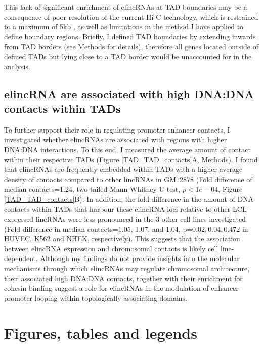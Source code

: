 \documentclass[11pt,a4paper]{report}
\begin{document}
This lack of significant enrichment of elincRNAs at TAD boundaries may be a consequence of poor resolution of the current Hi-C technology, which is restrained to a maximum of 5kb \cite{Rao2014}⁠, as well as limitations in the method I have applied to define boundary regions. Briefly, I defined TAD boundaries by extending inwards from TAD borders (see Methods for details), therefore all genes located outside of defined TADs but lying close to a TAD border would be unaccounted for in the analysis. 


\subsection*{elincRNA are associated with high DNA:DNA contacts within TADs}

To further support their role in regulating promoter-enhancer contacts, I investigated whether elincRNAs are associated with regions with higher DNA:DNA interactions. To this end, I measured the average amount of contact within their respective TADs (Figure \ref{TAD_TAD_contacts}A, Methods). I found that elincRNAs are frequently embedded within TADs with a higher average density of contacts compared to other lincRNAs in GM12878 (Fold difference of median contacts=1.24, two-tailed Mann-Whitney U test, $p<1e-04$, Figure \ref{TAD_TAD_contacts}B). In addition, the fold difference in the amount of DNA contacts within TADs that harbour these elincRNA loci relative to other LCL-expressed lincRNAs were less pronounced in the 3 other cell lines investigated (Fold difference in median contacts=1.05, 1.07, and 1.04, p=$0.02, 0.04, 0.472$ in HUVEC, K562 and NHEK, respectively). This suggests that the association between elincRNA expression and chromosomal contacts is likely cell line-dependent. 
Although my findings do not provide insights into the molecular mechanisms through which elincRNAs may regulate chromosomal architecture, their associated high DNA:DNA contacts, together with their enrichment for cohesin binding suggest a role for elincRNAs in the modulation of enhancer-promoter looping within topologically associating domains.

\section*{Figures, tables and legends}
\end{document}
